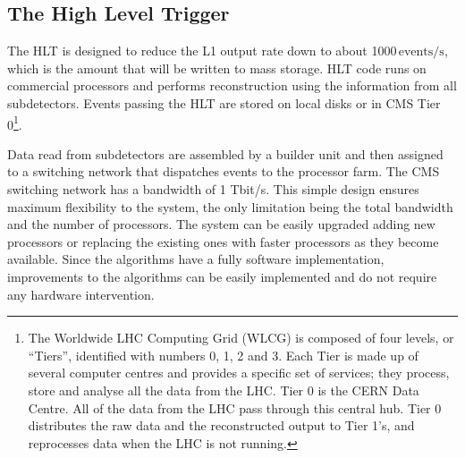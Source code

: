\subsection{The High Level Trigger}

The HLT is designed to reduce the L1 output rate down to about 1000\,$\mathrm{events/s}$, which is the amount that will be written to mass storage. HLT code runs on commercial processors and performs reconstruction using the information from all subdetectors. Events passing
the HLT are stored on local disks or in CMS Tier 0\footnote{The Worldwide LHC Computing Grid (WLCG) is composed of four levels, or ``Tiers'', identified with numbers 0, 1, 2 and 3. Each Tier is made up of several computer centres and provides a specific set of services; they process, store and analyse all the data from the LHC. Tier 0 is the CERN Data Centre. All of the data from the LHC pass through this central hub. Tier 0 distributes the raw data and the reconstructed output to Tier 1's, and reprocesses data when the LHC is not running.}. 

Data read from subdetectors are assembled by a builder unit and then assigned to a switching network that dispatches events to the processor farm. The CMS switching network has a bandwidth of 1 Tbit/s. This simple design ensures maximum flexibility to the system, the only limitation being the total bandwidth and the number of processors. The system can be easily upgraded adding new processors or replacing the existing ones with faster processors as they become available. Since the algorithms have a fully software implementation, improvements to the algorithms can be easily implemented and do not require any hardware intervention.

